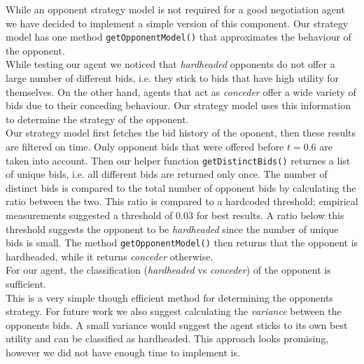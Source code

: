 
While an opponent strategy model is not required for a good negotiation agent we have decided to implement a simple version of this component. Our strategy model has one method \texttt{getOpponentModel()} that approximates the behaviour of the opponent. \\

While testing our agent we noticed that \emph{hardheaded} opponents do not offer a large number of different bids, i.e. they stick to bids that have high utility for themselves. On the other hand, agents that act as \emph{conceder} offer a wide variety of bids due to their conceding behaviour. Our strategy model uses this information to determine the strategy of the opponent. \\

Our strategy model first fetches the bid history of the oponent, then these results are filtered on time. Only opponent bids that were offered before $t=0.6$ are taken into account. Then our helper function \texttt{getDistinctBids()} returnes a list of unique bids, i.e. all different bids are returned only once. The number of distinct bids is compared to the total number of opponent bids by calculating the ratio between the two. This ratio is compared to a hardcoded threshold; empirical measurements suggested a threshold of $0.03$ for best results. A ratio below this threshold suggests the opponent to be \emph{hardheaded} since the number of unique bids is small. The method \texttt{getOpponentModel()} then returns that the opponent is hardheaded, while it returns \emph{conceder} otherwise. \\

For our agent, the classification (\emph{hardheaded} vs \emph{conceder}) of the opponent is sufficient.  \\

This is a very simple though efficient method for determining the opponents strategy. For future work we also suggest calculating the \emph{variance} between the opponents bids. A small variance would suggest the agent sticks to its own best utility and can be classified as hardheaded. This approach looks promising, however we did not have enough time to implement is.
